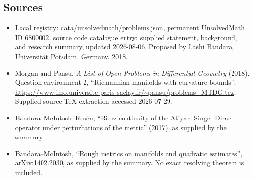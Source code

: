 \documentclass[11pt]{article}
\begin{document}
\subsection{Sources}
\begin{itemize}
\item Local registry: \url{data/unsolvedmath/problems.json}, permanent UnsolvedMath ID \(6800002\), source code catalogue entry; supplied statement, background, and research summary, updated 2026-08-06. Proposed by Lashi Bandara, Universit\"at Potsdam, Germany, 2018.
\item Morgan and Pansu, \emph{A List of Open Problems in Differential Geometry} (2018), Question environment 2, ``Riemannian manifolds with curvature bounds'': \url{https://www.imo.universite-paris-saclay.fr/~pansu/problems_MTDG.tex}. Supplied source-TeX extraction accessed 2026-07-29.
\item Bandara--McIntosh--Ros\'en, ``Riesz continuity of the Atiyah--Singer Dirac operator under perturbations of the metric'' (2017), as supplied by the summary.
\item Bandara--McIntosh, ``Rough metrics on manifolds and quadratic estimates'', arXiv:1402.2030, as supplied by the summary. No exact resolving theorem is included.
\end{itemize}
\end{document}
